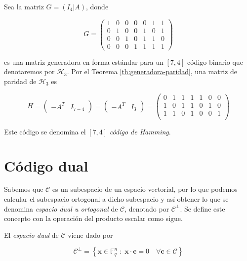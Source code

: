 \begin{exampleth}
    \label{ex:generadora-paridad}
    Sea la matriz $G = \left( I_4 | A \right)$, donde 
    
    \[
        G = \left( 
        \begin{array}{cccc|ccc}  
            1 & 0 & 0 & 0 & 0 & 1 & 1 \\
            0 & 1 & 0 & 0 & 1 & 0 & 1 \\
            0 & 0 & 1 & 0 & 1 & 1 & 0 \\
            0 & 0 & 0 & 1 & 1 & 1 & 1
        \end{array} 
        \right)
    \]

    es una matriz generadora en forma estándar para un $[7, 4]$ código binario que denotaremos por $\mathcal{H}_3$. Por el Teorema \ref{th:generadora-paridad}, una matriz de paridad de $\mathcal{H}_3$ es

    \[ 
        H = 
        \left( 
        \begin{array}{c|c}  
            -A^T & I_{7-4}
        \end{array} 
        \right)
        = 
        \left( 
        \begin{array}{c|c}  
            -A^T & I_{3}
        \end{array} 
        \right)
        =
        \left( 
        \begin{array}{cccc|ccc}  
            0 & 1 & 1 & 1 & 1 & 0 & 0 \\
            1 & 0 & 1 & 1 & 0 & 1 & 0 \\
            1 & 1 & 0 & 1 & 0 & 0 & 1 \\
        \end{array} 
        \right)
    \]

    Este código se denomina el $[7, 4]$ \emph{código de Hamming}.
\end{exampleth}

\section{Código dual}

Sabemos que $\mathcal{C}$ es un subespacio de un espacio vectorial, por lo que podemos calcular el subespacio ortogonal a dicho subespacio y así obtener lo que se denomina \emph{espacio dual u ortogonal} de $\mathcal{C}$, denotado por $\mathcal{C} ^{\perp}$. Se define este concepto con la operación del producto escalar como sigue.

\begin{definition}
    El \emph{espacio dual} de $\mathcal{C}$ viene dado por 
    
    $$\mathcal{C} ^{\perp} = \left\{ \mathbf{x} \in \mathbb{F}_q^n \; : \; \mathbf{x} \cdot \mathbf{c} = 0 \quad \forall \mathbf{c} \in \mathcal{C} \right\}$$
\end{definition}

